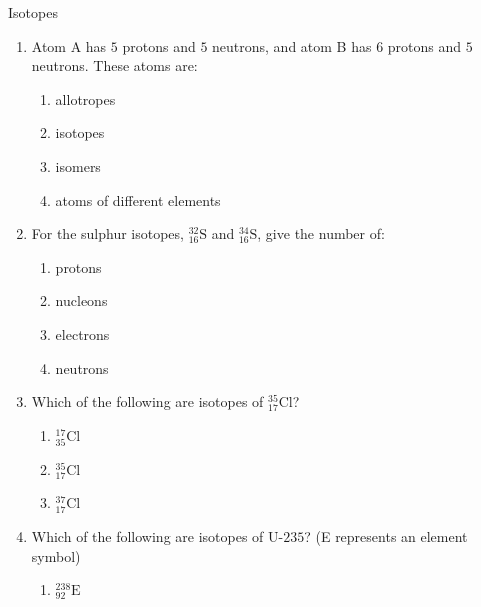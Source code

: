    \begin{exercises}  {Isotopes }
            \nopagebreak \noindent
        \label{m38753*id258162}\begin{enumerate}[noitemsep, label=\textbf{\arabic*}. ] 
            \label{m38753*uid50}\item Atom A has $5$ protons and $5$ neutrons, and atom B has $6$ protons and $5$ neutrons. These atoms are:
\label{m38753*id258178}\begin{enumerate}[noitemsep, label=\textbf{\alph*}. ] 
            \label{m38753*uid51}\item allotropes
\label{m38753*uid52}\item isotopes
\label{m38753*uid53}\item isomers
\label{m38753*uid54}\item atoms of different elements
\end{enumerate}
                \label{m38753*uid55}\item For the sulphur isotopes, $_{16}^{32}\text{S}$ and $_{16}^{34}\text{S}$, give the number of:
\label{m38753*id258277}\begin{enumerate}[noitemsep, label=\textbf{\alph*}. ] 
            \label{m38753*uid56}\item protons
\label{m38753*uid57}\item nucleons
\label{m38753*uid58}\item electrons
\label{m38753*uid59}\item neutrons
\end{enumerate}
                \label{m38753*uid60}\item Which of the following are isotopes of $_{17}^{35}\text{Cl}$?
\label{m38753*id258355}\begin{enumerate}[noitemsep, label=\textbf{\alph*}. ] 
            \label{m38753*uid61}\item $_{35}^{17}\text{Cl}$
\label{m38753*uid62}\item $_{17}^{35}\text{Cl}$
\label{m38753*uid63}\item $_{17}^{37}\text{Cl}$
\end{enumerate}
                \label{m38753*uid64}\item Which of the following are isotopes of $\text{U-}235$? (E represents an element symbol)
\label{m38753*id258452}\begin{enumerate}[noitemsep, label=\textbf{\alph*}. ] 
            \label{m38753*uid65}\item $_{92}^{238}\text{E}$

\end{enumerate}
\end{enumerate}
\end{exercises}
